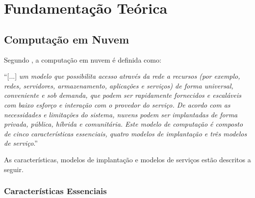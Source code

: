 
\chapter{Fundamentação Teórica}
\label{c_fundamentacao}

\section{Computação em Nuvem}

Segundo , a computação em nuvem é definida como:

\begin{citacao}
``[...] \textit{um modelo que possibilita acesso através da rede a recursos (por exemplo, redes, servidores, armazenamento, aplicações e serviços) de forma universal, conveniente e sob demanda, que podem ser rapidamente fornecidos e escaláveis com baixo esforço e interação com o provedor do serviço. De acordo com as necessidades e limitações do sistema, nuvens podem ser implantadas de forma privada, pública, híbrida e comunitária. Este modelo de computação é composto de cinco características essenciais, quatro modelos de implantação e três modelos de serviço}.''
\end{citacao}

As características, modelos de implantação e modelos de serviços estão descritos a seguir.

\subsection{Características Essenciais}

